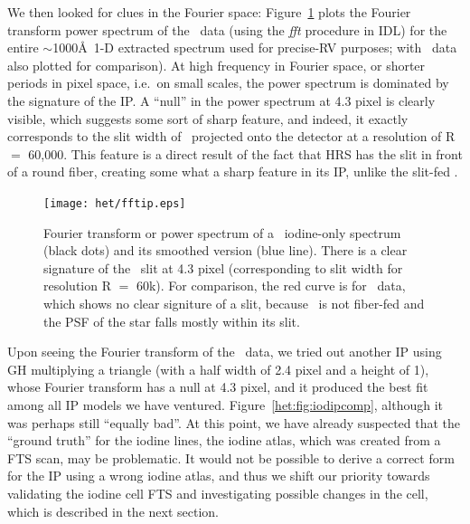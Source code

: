 We then looked for clues in the Fourier space:
Figure~\ref{het:fig:fftip} plots the Fourier transform power spectrum
of the \het\ data (using the {\it fft} procedure in IDL) for the
entire $\sim$1000\AA\ 1-D extracted spectrum used for precise-RV
purposes; with \keck\ data also plotted for comparison). At high
frequency in Fourier space, or shorter periods in pixel space, i.e.\
on small scales, the power spectrum is dominated by the signature of
the IP. A ``null'' in the power spectrum at 4.3 pixel is clearly
visible, which suggests some sort of sharp feature, and indeed, it
exactly corresponds to the slit width of \het\ projected onto the
detector at a resolution of R $=$ 60,000. This feature is a direct
result of the fact that HRS has the slit in front of a round fiber,
creating some what a sharp feature in its IP, unlike the slit-fed
\keck.


\begin{figure}
\centering
\texttt{[image: het/fftip.eps]}
\caption{Fourier transform or power spectrum of a \het\ iodine-only
  spectrum (black dots) and its smoothed version (blue line). There is
  a clear signature of the \het\ slit at 4.3 pixel (corresponding to
  slit width for resolution R $=$ 60k). For comparison, the red curve
  is for \keck\ data, which shows no clear signiture of a slit,
  because \keck\ is not fiber-fed and the PSF of the star falls mostly
  within its slit.
\label{het:fig:fftip}}
\end{figure}


Upon seeing the Fourier transform of the \het\ data, we tried out
another IP using GH multiplying a triangle (with a half width of 2.4
pixel and a height of 1), whose Fourier transform has a null at 4.3
pixel, and it produced the best fit among all IP models we have
ventured. Figure~\ref{het:fig:iodipcomp}, although it was perhaps
still ``equally bad''. At this point, we have already suspected that
the ``ground truth'' for the iodine lines, the iodine atlas, which was
created from a FTS scan, may be problematic. It would not be possible
to derive a correct form for the IP using a wrong iodine atlas, and
thus we shift our priority towards validating the iodine cell FTS and
investigating possible changes in the cell, which is described in the
next section.


